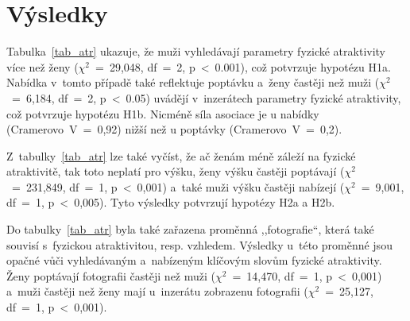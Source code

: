 \documentclass[a4paper, 12pt, notitlepage, oneside, numbers=noenddot]{report}
\begin{document}
\section{Výsledky}


Tabulka~\ref{tab_atr} ukazuje, že muži vyhledávají parametry fyzické
atraktivity více než ženy ($\chi^2$~=~29,048, df~=~2,
p~{\textless}~0.001), což potvrzuje hypotézu H1a. Nabídka v~tomto
případě také reflektuje poptávku a~ženy častěji než muži
($\chi^2$~=~6,184, df~=~2, p~{\textless}~0.05) uvádějí v~inzerátech
parametry fyzické atraktivity, což potvrzuje hypotézu H1b. Nicméně
síla asociace je u nabídky (Cramerovo~V~=~0,92) nižší než u poptávky
(Cramerovo~V~=~0,2).

Z~tabulky~\ref{tab_atr} lze také vyčíst, že ač ženám méně záleží na
fyzické atraktivitě, tak toto neplatí pro výšku, ženy výšku častěji
poptávají ($\chi^2$~=~231,849, df~=~1, p~{\textless}~0,001) a~také
muži výšku častěji nabízejí ($\chi^2$~=~9,001, df~=~1,
p~{\textless}~0,005).  Tyto výsledky potvrzují hypotézy H2a a H2b.

Do tabulky~\ref{tab_atr} byla také zařazena proměnná ,,fotografie``,
která také souvisí s~fy\-zickou atraktivitou, resp. vzhledem. Výsledky
u~této proměnné jsou opačné vůči vy\-hle\-dávaným a~nabízeným klíčovým
slovům fyzické atraktivity.  Ženy poptávají fotografii častěji než
muži ($\chi^2$~=~14,470, df~=~1, p~{\textless}~0,001) a~muži častěji
než ženy mají u~inzerátu zobrazenu fotografii ($\chi^2$~=~25,127,
df~=~1, p~{\textless}~0,001).
\end{document}
